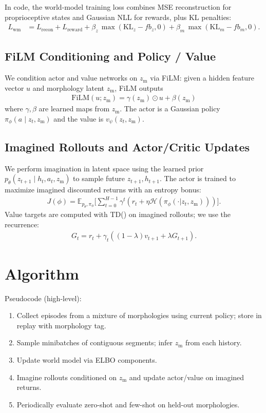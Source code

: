 \documentclass{article}
\begin{document}
In code, the world-model training loss combines MSE reconstruction for proprioceptive states and Gaussian NLL for rewards, plus KL penalties:
\begin{align}
L_{\mathrm{wm}} &= L_{\mathrm{recon}} + L_{\mathrm{reward}} + \beta_z\,\max(\mathrm{KL}_z - fb_z,0) + \beta_m\,\max(\mathrm{KL}_m - fb_m,0).
\end{align}

\subsection{FiLM Conditioning and Policy / Value}
We condition actor and value networks on $z_{\mathrm{m}}$ via FiLM: given a hidden feature vector $u$ and morphology latent $z_{\mathrm{m}}$, FiLM outputs
\begin{align}
\mathrm{FiLM}(u; z_{\mathrm{m}}) = \gamma(z_{\mathrm{m}}) \odot u + \beta(z_{\mathrm{m}})
\end{align}
where $\gamma,\beta$ are learned maps from $z_{\mathrm{m}}$. The actor is a Gaussian policy $\pi_\phi(a\mid z_t,z_{\mathrm{m}})$ and the value is $v_\psi(z_t,z_{\mathrm{m}})$.

\subsection{Imagined Rollouts and Actor/Critic Updates}
We perform imagination in latent space using the learned prior $p_\theta(z_{t+1}\mid h_t,a_t,z_{\mathrm{m}})$ to sample future $z_{t+1},h_{t+1}$. The actor is trained to maximize imagined discounted returns with an entropy bonus:
\begin{align}
J(\phi) = \mathbb{E}_{p_\theta,\pi_\phi}\Big[\sum_{t=0}^{H-1} \gamma^t (r_t + \eta\mathcal{H}(\pi_\phi(\cdot|z_t,z_{\mathrm{m}})))\Big].
\end{align}
Value targets are computed with TD(\lambda) on imagined rollouts; we use the recurrence:
\begin{align}
G_t = r_t + \gamma_t((1-\lambda)v_{t+1} + \lambda G_{t+1}).
\end{align}

\section{Algorithm}
Pseudocode (high-level):
\begin{enumerate}
\item Collect episodes from a mixture of morphologies using current policy; store in replay with morphology tag.
\item Sample minibatches of contiguous segments; infer $z_{\mathrm{m}}$ from each history.
\item Update world model via ELBO components.
\item Imagine rollouts conditioned on $z_{\mathrm{m}}$ and update actor/value on imagined returns.
\item Periodically evaluate zero-shot and few-shot on held-out morphologies.
\end{enumerate}
\end{document}
